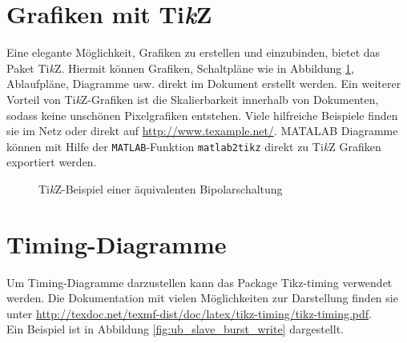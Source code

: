 \section{Grafiken mit Ti\textit{k}Z}
Eine elegante Möglichkeit, Grafiken zu erstellen und einzubinden, bietet das Paket Ti\textit{k}Z. Hiermit können Grafiken, Schaltpläne wie in Abbildung \ref{fig:Insulated-gate-bipolar-transistor-equivalent-circuit}, 
Ablaufpläne, Diagramme usw. direkt im Dokument erstellt werden. Ein weiterer Vorteil von Ti\textit{k}Z-Grafiken
ist die Skalierbarkeit innerhalb von Dokumenten, sodass keine unschönen Pixelgrafiken entstehen. Viele hilfreiche Beispiele finden sie im Netz oder direkt auf 
\url{http://www.texample.net/}.
MATALAB Diagramme können mit Hilfe der \texttt{MATLAB}-Funktion
\texttt{matlab2tikz} direkt zu Ti\textit{k}Z Grafiken exportiert werden.

\begin{figure}[hbt]
  \begin{center}
  
  \caption{Ti\textit{k}Z-Beispiel einer äquivalenten Bipolarschaltung}
  \label{fig:Insulated-gate-bipolar-transistor-equivalent-circuit}
  \end{center}
\end{figure}


\section{Timing-Diagramme}
Um Timing-Diagramme darzustellen kann das Package Tikz-timing verwendet werden. Die Dokumentation mit vielen Möglichkeiten zur Darstellung finden sie unter \url{http://texdoc.net/texmf-dist/doc/latex/tikz-timing/tikz-timing.pdf}. \\
Ein Beispiel ist in Abbildung \ref{fig:ub_slave_burst_write} dargestellt.

